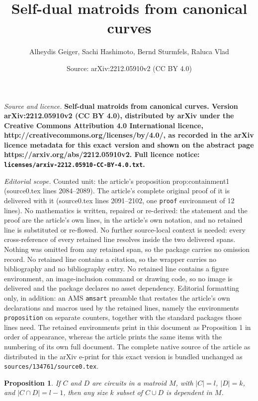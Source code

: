 \documentclass[10pt,a4paper]{amsart}
\title{\bf Self-dual matroids from canonical curves}
\author{Alheydis Geiger, Sachi Hashimoto, Bernd Sturmfels, Raluca Vlad}
\date{Source: arXiv:2212.05910v2 (CC BY 4.0)}
\newtheorem{proposition}{Proposition}
\begin{document}
\maketitle

\noindent\emph{Source and licence.} \bf Self-dual matroids from canonical curves. Version arXiv:2212.05910v2 (CC BY 4.0), distributed by arXiv under the Creative Commons Attribution 4.0 International licence, http://creativecommons.org/licenses/by/4.0/, as recorded in the arXiv licence metadata for this exact version and shown on the abstract page https://arxiv.org/abs/2212.05910v2. Full licence notice: \texttt{licenses/arxiv-2212.05910-CC-BY-4.0.txt}.\par\smallskip

\noindent\textit{Editorial scope.} Counted unit: the article's proposition prop:containment1 (source0.tex lines 2084--2089). The article's complete original proof of it is delivered with it (source0.tex lines 2091--2102, one \texttt{proof} environment of 12 lines). No mathematics is written, repaired or re-derived: the statement and the proof are the article's own lines, in the article's own notation, and no retained line is substituted or re-flowed.  No further source-local context is needed: every cross-reference of every retained line resolves inside the two delivered spans.  Nothing was omitted from any retained span, so the package carries no omission record.  No retained line contains a citation, so the wrapper carries no bibliography and no bibliography entry.  No retained line contains a figure environment, an image-inclusion command or drawing code, so no image is delivered and the package declares no asset dependency.  Editorial formatting only, in addition: an AMS \texttt{amsart} preamble that restates the article's own declarations and macros used by the retained lines, namely the environments \texttt{proposition} on separate counters, together with the standard packages those lines need.  The retained environments print in this document as Proposition 1 in order of appearance, whereas the article prints the same items with the numbering of its own full document.  The complete native source of the article as distributed in the arXiv e-print for this exact version is bundled unchanged as \texttt{sources/134761/source0.tex}.
\begin{proposition}
  \label{prop:containment1}
  If $C$ and $D$ are circuits in a matroid $M$, with $|C| = l$, $|D| = k$, and $|C \cap D| = l-1$, then any size $k$ subset of $C \cup D$ is dependent in $M$.
\end{proposition}
\end{document}
